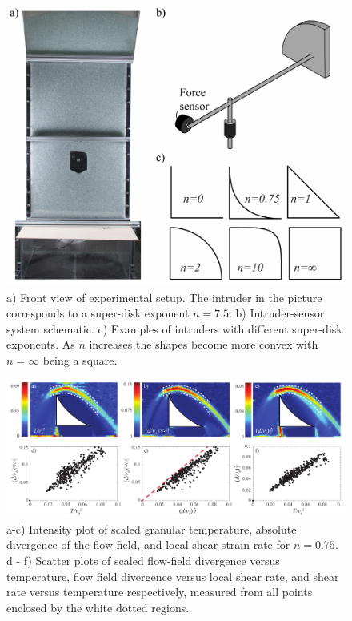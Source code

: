 \begin{figure}
	\includegraphics[width=\textwidth]{Figures/chapter3/schematic}
	\caption{a) Front view of experimental setup.  The intruder in the picture corresponds to a super-disk exponent $n=7.5$.  b) Intruder-sensor system schematic. c) Examples of intruders with different super-disk exponents. As $n$ increases the shapes become more convex with $n=\infty$ being a square.}
	\label{schematic}
\end{figure}

\begin{figure}
	\includegraphics[width=\textwidth]{Figures/chapter3/graphPanel}
	\caption{a-c) Intensity plot of scaled granular temperature, absolute divergence of the flow field, and local shear-strain rate for $n=0.75$. d - f) Scatter plots of scaled flow-field divergence versus temperature, flow field divergence versus local shear rate, and shear rate versus temperature respectively, measured from all points enclosed by the white dotted regions.}
	\label{mapPanel}
\end{figure}

